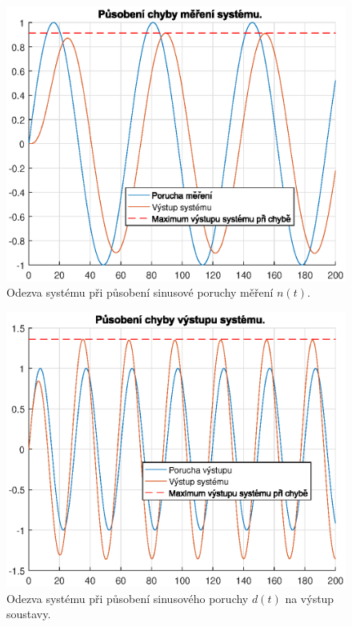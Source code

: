 \documentclass[a4paper,11pt]{article}
\begin{document}
\begin{figure}[htbp]
	\begin{center}
	\includegraphics[scale = 1.0]{obrazky/nT.eps}
	\caption{Odezva systému při působení sinusové poruchy měření $ n\left ( t \right ) $.}
	\label{fig:4_energie-n}
	\end{center}
\end{figure}

\begin{figure}[htbp]
	\begin{center}
	\includegraphics[scale = 1.0]{obrazky/dS.eps}
	\caption{Odezva systému při působení sinusového poruchy $ d\left ( t \right ) $ na výstup soustavy.}
	\label{fig:4_energie-d}
	\end{center}
\end{figure}
\end{document}

